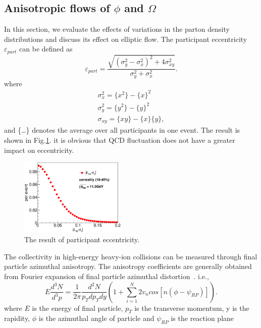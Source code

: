 \documentclass[twocolumn,aps,prc,showpacs,superscriptaddress,preprintnumbers,floatfix,nofootinbib]{revtex4}
\begin{document}
\begin{CJK*}{GBK}{song}
  \section{Anisotropic flows of $\phi$ and $\Omega$}
  In this section, we evaluate the effects of variations in the parton density distributions
  and discuss its effect on elliptic flow. The participant eccentricity $\varepsilon_{part}$
  can be defined as
  \begin{equation}
    \label{eq:equationeccentricity}
    \varepsilon_{part} = \frac{\sqrt{(\sigma_{y}^{2}-\sigma_{x}^{2})^2+4\sigma_{xy}^{2}}}{\sigma_{y}^{2}+\sigma_{x}^{2}}.
  \end{equation}
  where
  \begin{gather}
    \label{eq:1}
    \sigma_{x}^{2} = \{x^{2}\}-\{x\}^{2}\\
    \sigma_{y}^{2} = \{y^{2}\}-\{y\}^{2}\\
    \sigma_{xy} = \{xy\}-\{x\}\{y\},
\end{gather}
and \{\dots\} denotes the average over all participants in one event.
The result is shown in Fig.\ref{fig:figureeccentricity}. it is obvious that QCD fluctuation
does not have a greater impact on eccentricity.
\begin{figure}[hbpt]
  \centering
  \includegraphics[width=0.45\textwidth]{./figure/eccentricity.eps}
  \caption{The result of participant eccentricity.}
  \label{fig:figureeccentricity}
\end{figure}
The collectivity in high-energy heavy-ion collisions can be measured through final particle
azimuthal anisotropy. The anisotropy coefficients are generally obtained from Fourier
expansion of final particle azimuthal distortion~\cite{MALONG}. i.e.,
\begin{equation}
  \label{eq:equationfourier}
  E\frac{d^{3}N}{d^{3}p} = \frac{1}{2\pi}\frac{d^{2}N}{p_{T}dp_{T}dy}\left(1+\sum^{N}_{i=1}{2v_{n}cos[n(\phi-\psi_{RP})]}\right).
\end{equation}
where $E$ is the energy of final particle, $p_{T}$ is the transverse momentum, y is the
rapidity, $\phi$ is the azimuthal angle of particle and $\psi_{RP}$ is the reaction plane

\end{CJK*}
\end{document}
